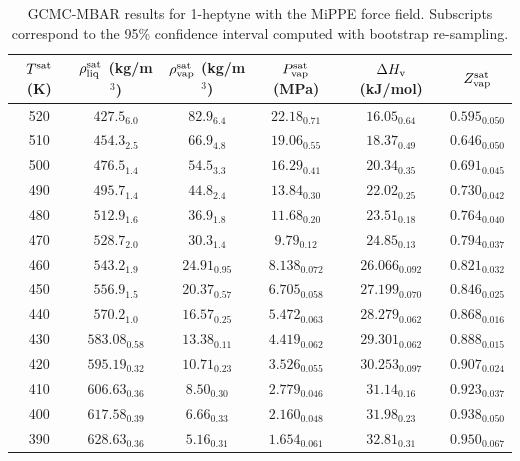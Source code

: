 \documentclass[journal=jctc,manuscript=article]{achemso}
\begin{document}
\begin{table}[htb!]
	\caption{GCMC-MBAR results for 1-heptyne with the MiPPE force field. Subscripts correspond to the 95\% confidence interval computed with bootstrap re-sampling.}
	\begin{center}
		\begin{tabular}{|c|c|c|c|c|c|}
			\hline
			$T^{\rm sat}$ (K) & $\rho_{\rm liq}^{\rm sat}$ (kg/m$^3$) & $\rho_{\rm vap}^{\rm sat}$ (kg/m$^3$) & $P_{\rm vap}^{\rm sat}$ (MPa) & $\Delta H_{\rm v}$ (kJ/mol) & $Z_{\rm vap}^{\rm sat}$ \\ \hline
			520 & $427.5_{6.0}$ & $82.9_{6.4}$ & $22.18_{0.71}$ & $16.05_{0.64}$ & $0.595_{0.050}$ \\
			510 & $454.3_{2.5}$ & $66.9_{4.8}$ & $19.06_{0.55}$ & $18.37_{0.49}$ & $0.646_{0.050}$ \\
			500 & $476.5_{1.4}$ & $54.5_{3.3}$ & $16.29_{0.41}$ & $20.34_{0.35}$ & $0.691_{0.045}$ \\
			490 & $495.7_{1.4}$ & $44.8_{2.4}$ & $13.84_{0.30}$ & $22.02_{0.25}$ & $0.730_{0.042}$ \\
			480 & $512.9_{1.6}$ & $36.9_{1.8}$ & $11.68_{0.20}$ & $23.51_{0.18}$ & $0.764_{0.040}$ \\
			470 & $528.7_{2.0}$ & $30.3_{1.4}$ & $9.79_{0.12}$ & $24.85_{0.13}$ & $0.794_{0.037}$ \\
			460 & $543.2_{1.9}$ & $24.91_{0.95}$ & $8.138_{0.072}$ & $26.066_{0.092}$ & $0.821_{0.032}$ \\
			450 & $556.9_{1.5}$ & $20.37_{0.57}$ & $6.705_{0.058}$ & $27.199_{0.070}$ & $0.846_{0.025}$ \\
			440 & $570.2_{1.0}$ & $16.57_{0.25}$ & $5.472_{0.063}$ & $28.279_{0.062}$ & $0.868_{0.016}$ \\
			430 & $583.08_{0.58}$ & $13.38_{0.11}$ & $4.419_{0.062}$ & $29.301_{0.062}$ & $0.888_{0.015}$ \\
			420 & $595.19_{0.32}$ & $10.71_{0.23}$ & $3.526_{0.055}$ & $30.253_{0.097}$ & $0.907_{0.024}$ \\
			410 & $606.63_{0.36}$ & $8.50_{0.30}$ & $2.779_{0.046}$ & $31.14_{0.16}$ & $0.923_{0.037}$ \\
			400 & $617.58_{0.39}$ & $6.66_{0.33}$ & $2.160_{0.048}$ & $31.98_{0.23}$ & $0.938_{0.050}$ \\
			390 & $628.63_{0.36}$ & $5.16_{0.31}$ & $1.654_{0.061}$ & $32.81_{0.31}$ & $0.950_{0.067}$ \\
			\hline
		\end{tabular}
	\end{center}
\end{table}
\end{document}
